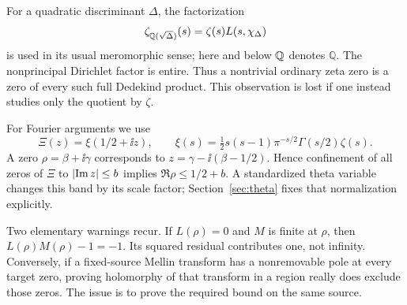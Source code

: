 For a quadratic discriminant $\Delta$, the factorization
\begin{equation}\label{eq:quadratic-factorization}
 \zeta_{\mathbb Q(\sqrt\Delta)}(s)=\zeta(s)L(s,\chi_\Delta)
\end{equation}
is used in its usual meromorphic sense; here and below $\mathbb Q$ denotes $\mathbb Q$. The nonprincipal Dirichlet factor is entire. Thus a nontrivial ordinary zeta zero is a zero of every such full Dedekind product. This observation is lost if one instead studies only the quotient by $\zeta$.

For Fourier arguments we use
\[
 \Xi(z)=\xi(1/2+\ii z),\qquad
 \xi(s)=\tfrac12s(s-1)\pi^{-s/2}\Gamma(s/2)\zeta(s).
\]
A zero $\rho=\beta+\ii\gamma$ corresponds to $z=\gamma-\ii(\beta-1/2)$. Hence confinement of all zeros of $\Xi$ to $\lvert\operatorname{Im} z\rvert\le b$ implies $\Re\rho\le 1/2+b$. A standardized theta variable changes this band by its scale factor; Section~\ref{sec:theta} fixes that normalization explicitly.

Two elementary warnings recur. If $L(\rho)=0$ and $M$ is finite at $\rho$, then $L(\rho)M(\rho)-1=-1$. Its squared residual contributes one, not infinity. Conversely, if a fixed-source Mellin transform has a nonremovable pole at every target zero, proving holomorphy of that transform in a region really does exclude those zeros. The issue is to prove the required bound on the same source.
